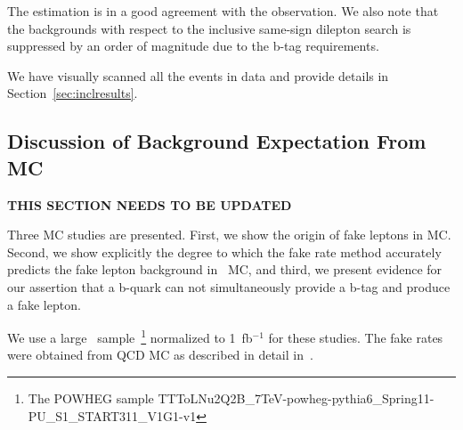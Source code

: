\begin{table}[hbt]
\begin{center}

\end{center}
\caption{\label{tab:yieldsnu_hpt}Observed event yields in high-\pt\ (pT $>$ 20/20) dileptons
passing the {\em pMSSW/sneutrino} signal selections ($H_T > 320$ GeV, \met $>$ 120 GeV)
compared to expectations from simulation alone, and from the data-driven methods.
The {\em simulated backgrounds} contribution includes contributions from genuine  same-sign lepton
pairs (WZ, ZZ, leptons from same-sign W from single-, double-parton, and $t\bar{t}W$ production, etc.), 
as well as electrons from converted photons in $V\gamma$ production.
Entries with zero contributing events are reported with an uncertainty corresponding to one event.
This uncertainty is not added to the total MC contribution.
Systematic uncertainties (the second uncertainty if present)
 are displayed only for the final combined type of background, no systematic
uncertainty is added for estimates with zero entries.
Systematic uncertainties are 100\% correlated among the channels.
}
\end{table}

\clearpage

The estimation
is in a good agreement with the observation. We also note that the backgrounds with respect to the inclusive same-sign
dilepton search is suppressed by an order of magnitude due to the b-tag requirements.

We have visually scanned all the events in data and provide details in Section~\ref{sec:inclresults}.


\subsection{Discussion of Background Expectation From MC}
\label{sec:bkgdiscussion}

{\bf THIS SECTION NEEDS TO BE UPDATED}

Three MC studies are presented. First, we show the origin of fake leptons in MC.
Second, we 
show explicitly the degree to which the fake rate method
accurately predicts the fake lepton background in \ttbar\ MC, 
and third, we present evidence for our assertion that a b-quark can not simultaneously provide a b-tag and produce a fake lepton.

We use a large \ttbar\ sample~\footnote{The POWHEG sample TTToLNu2Q2B\_7TeV-powheg-pythia6\_Spring11-PU\_S1\_START311\_V1G1-v1 } 
normalized to 1~fb$^{-1}$ for these studies. 
The fake rates were obtained from QCD MC as described in detail in~\cite{ssnote2011}.

